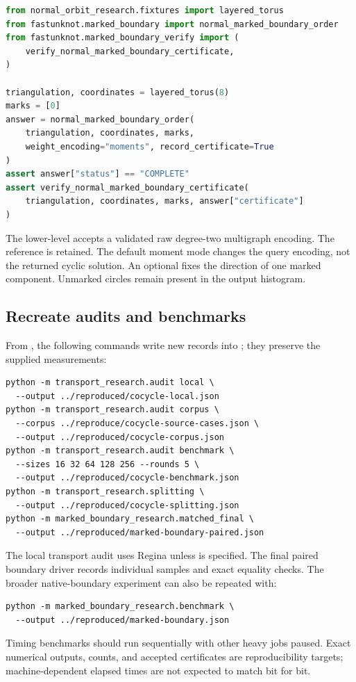 \begin{lstlisting}[language=Python]
from normal_orbit_research.fixtures import layered_torus
from fastunknot.marked_boundary import normal_marked_boundary_order
from fastunknot.marked_boundary_verify import (
    verify_normal_marked_boundary_certificate,
)

triangulation, coordinates = layered_torus(8)
marks = [0]
answer = normal_marked_boundary_order(
    triangulation, coordinates, marks,
    weight_encoding="moments", record_certificate=True
)
assert answer["status"] == "COMPLETE"
assert verify_normal_marked_boundary_certificate(
    triangulation, coordinates, marks, answer["certificate"]
)
\end{lstlisting}

The lower-level 
accepts a validated raw degree-two multigraph encoding. The reference
 is retained. The default moment mode
changes the query encoding, not the returned cyclic solution.
An optional  fixes the direction of one marked
component. Unmarked circles remain present in the output histogram.

\subsection{Recreate audits and benchmarks}

From , the following commands write new records into
; they preserve the supplied measurements:
\begin{lstlisting}
python -m transport_research.audit local \
  --output ../reproduced/cocycle-local.json
python -m transport_research.audit corpus \
  --corpus ../reproduce/cocycle-source-cases.json \
  --output ../reproduced/cocycle-corpus.json
python -m transport_research.audit benchmark \
  --sizes 16 32 64 128 256 --rounds 5 \
  --output ../reproduced/cocycle-benchmark.json
python -m transport_research.splitting \
  --output ../reproduced/cocycle-splitting.json
python -m marked_boundary_research.matched_final \
  --output ../reproduced/marked-boundary-paired.json
\end{lstlisting}
The local transport audit uses Regina unless  is
specified. The final paired boundary driver records individual samples
and exact equality checks. The broader native-boundary experiment can
also be repeated with:
\begin{lstlisting}
python -m marked_boundary_research.benchmark \
  --output ../reproduced/marked-boundary.json
\end{lstlisting}
Timing benchmarks should run sequentially with other heavy jobs paused.
Exact numerical outputs, counts, and accepted certificates are
reproducibility targets; machine-dependent elapsed times are not expected
to match bit for bit.

